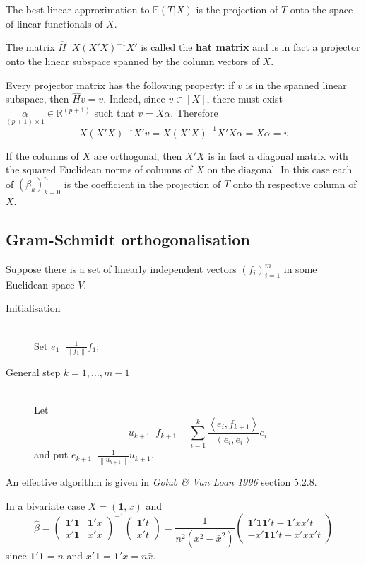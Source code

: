 \documentclass[a4paper]{article}
\newcommand{\clo}[1]{{\left [ #1 \right ]}}
\newcommand{\brac}[1]{{\left ( #1 \right )}}
\newcommand{\nrm}[1]{{\left\| #1 \right \|}}
\newcommand{\brkt}[1]{{\left\langle #1 \right\rangle}}
\newcommand{\Real}{\mathbb{R}}
\newcommand{\Ex}[0]{{\mathbb{E}}}
\newcommand{\one}{\mathbf{1}}
\newcommand{\defn}{\mathop{\overset{\Delta}{=}}\nolimits}
\begin{document}
The best linear approximation to $\Ex(T\rvert X)$ is the projection of $T$ onto the space of linear functionals of $X$.

The matrix $\hat{H} \defn X\brac{X'X}^{-1}X'$ is called the \textbf{hat matrix} and is in fact a projector onto the linear subspace spanned by the column vectors of $X$.

Every projector matrix has the following property: if $v$ is in the spanned linear subspace, then $\hat{H}v = v$.
Indeed, since $v\in \clo{X}$, there must exist $\underset{(p+1)\times 1}{\alpha}\in \Real^{(p+1)}$ such that $v = X\alpha$.
Therefore
\[X\brac{X'X}^{-1}X'v = X\brac{X'X}^{-1}X'X\alpha = X\alpha = v\]

If the columns of $X$ are orthogonal, then $X'X$ is in fact a diagonal matrix with the squared Euclidean norms of columns of $X$ on the diagonal.
In this case each of $\brac{\beta_k}_{k=0}^n$ is the coefficient in the projection of $T$ onto th respective column of $X$.


\subsection*{Gram-Schmidt orthogonalisation} %
\label{sub:gram_schmidt_orthogonalisation}

Suppose there is a set of linearly independent vectors $\brac{f_i}_{i=1}^m$ in some Euclidean space $V$.
\begin{description}
	\item[Initialisation] \hfill \\
		Set $e_1 \defn \frac{1}{\nrm{f_1}} f_1$;
	\item[General step $k=1,\ldots,m-1$] \hfill \\
		Let \[u_{k+1} \defn f_{k+1} - \sum_{i=1}^k \frac{\brkt{e_i, f_{k+1}}}{\brkt{e_i,e_i}} e_i\]
		and put $e_{k+1}\defn \frac{1}{\nrm{u_{k+1}}} u_{k+1}$.
\end{description}
An effective algorithm is given in \emph{Golub \& Van Loan 1996} section 5.2.8.


In a bivariate case $X = (\one,x)$ and
\[\hat{\beta} = \brac{\begin{matrix} \one'\one & \one'x\\ x'\one & x'x \end{matrix}}^{-1} \brac{\begin{matrix} \one't \\ x't \end{matrix}}
= \frac{1}{n^2 \brac{\overline{x^2} - \bar{x}^2}} \brac{\begin{matrix} \one'\one \one't - \one'x x't \\ - x'\one \one't + x'x x't \end{matrix}}
\]
since $\one'\one = n$ and $x'\one = \one'x = n\bar{x}$.
\end{document}
